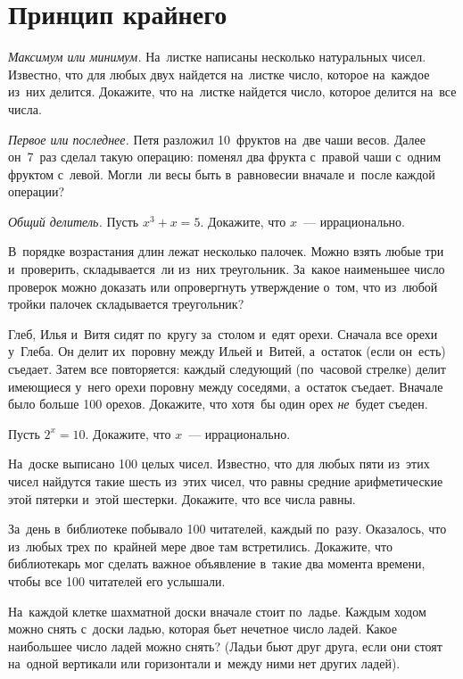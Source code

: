 
\section*{Принцип крайнего}


\begin{problems}

\itemx{$^\circ$}
\emph{Максимум или минимум.}
На~листке написаны несколько натуральных чисел.
Известно, что для любых двух найдется на~листке число, которое на~каждое из~них
делится.
Докажите, что на~листке найдется число, которое делится на~все числа.

\itemx{$^\circ$}
\emph{Первое или последнее.}
Петя разложил 10~фруктов на~две чаши весов.
Далее он~7~раз сделал такую операцию: поменял два фрукта с~правой чаши с~одним
фруктом с~левой.
Могли~ли весы быть в~равновесии вначале и~после каждой операции?

\itemx{$^\circ$}
\emph{Общий делитель.}
Пусть $x^3 + x = 5$.
Докажите, что $x$~--- иррационально.

\item
В~порядке возрастания длин лежат несколько палочек.
Можно взять любые три и~проверить, складывается~ли из~них треугольник.
За~какое наименьшее число проверок можно доказать или опровергнуть утверждение
о~том, что из~любой тройки палочек складывается треугольник?

\item
Глеб, Илья и~Витя сидят по~кругу за~столом и~едят орехи.
Сначала все орехи у~Глеба.
Он делит их~поровну между Ильей и~Витей, а~остаток (если он~есть) съедает.
Затем все повторяется: каждый следующий (по~часовой стрелке) делит имеющиеся
у~него орехи поровну между соседями, а~остаток съедает.
Вначале было больше 100 орехов.
Докажите, что хотя~бы один орех \emph{не}~будет съеден.

\item
Пусть $2^{x} = 10$.
Докажите, что $x$~--- иррационально.

\item
На~доске выписано 100 целых чисел.
Известно, что для любых пяти из~этих чисел найдутся такие шесть из~этих чисел,
что равны средние арифметические этой пятерки и~этой шестерки.
Докажите, что все числа равны.

\item
За~день в~библиотеке побывало 100 читателей, каждый по~разу.
Оказалось, что из~любых трех по~крайней мере двое там встретились.
Докажите, что библиотекарь мог сделать важное объявление в~такие два момента
времени, чтобы все 100 читателей его услышали.

\item
На~каждой клетке шахматной доски вначале стоит по~ладье.
Каждым ходом можно снять с~доски ладью, которая бьет нечетное число ладей.
Какое наибольшее число ладей можно снять?
(Ладьи бьют друг друга, если они стоят на~одной вертикали или горизонтали
и~между ними нет других ладей).

\end{problems}

